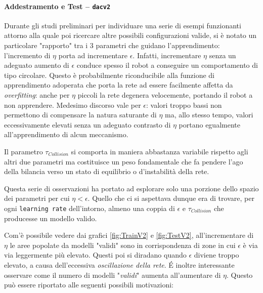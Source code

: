 \newpage
\restoregeometry


\paragraph{Addestramento e Test -- \texttt{dacv2}}\label{par:dacv2}\hfill

Durante gli studi preliminari per individuare una serie di esempi funzionanti attorno alla quale poi ricercare altre possibili configurazioni valide, si è notato un particolare "rapporto" tra i 3 parametri che guidano l'apprendimento: l'incremento di $\eta$ porta ad incrementare $\epsilon$.
Infatti, incrementare $\eta$ senza un adeguato aumento di $\epsilon$ conduce spesso il robot a conseguire un comportamento di tipo circolare. Questo è probabilmente riconducibile alla funzione di apprendimento adoperata che porta la rete ad essere facilmente affetta da \textit{overfitting}: anche per $\eta$ piccoli la rete degenera velocemente, portando il robot a non apprendere. Medesimo discorso vale per $\epsilon$: valori troppo bassi non permettono di compensare la natura saturante di $\eta$ ma, allo stesso tempo, valori eccessivamente elevati senza un adeguato contrasto di $\eta$ portano egualmente all'apprendimento di alcun meccanismo.

Il parametro $\tau_{Collision}$ si comporta in maniera abbastanza variabile rispetto agli altri due parametri ma costituisce un peso fondamentale che fa pendere l'ago della bilancia verso un stato di equilibrio o d'instabilità della rete. 

Questa serie di osservazioni ha portato ad esplorare solo una porzione dello spazio dei parametri per cui $\eta < \epsilon$. Quello che ci si aspettava dunque era di trovare, per ogni \texttt{learning rate} dell'intorno, almeno una coppia di $\epsilon$ e $\tau_{Collision}$ che producesse un modello valido. 

Com'è possibile vedere dai grafici \ref{fig:TrainV2} e \ref{fig:TestV2}, all'incrementare di $\eta$ le aree popolate da modelli "validi" sono in corrispondenza di zone in cui $\epsilon$ è via via leggermente più elevato. Questi poi si diradano quando $\epsilon$ diviene troppo elevato, a causa dell'eccessiva \textit{oscillazione della rete}. É inoltre interessante osservare come il numero di modelli "\textit{validi}" aumenta all'aumentare di $\eta$. Questo può essere riportato alle seguenti possibili motivazioni: 

